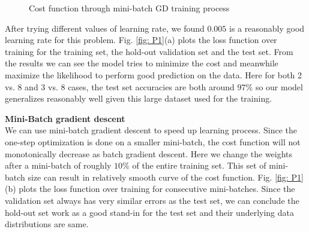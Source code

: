 \documentclass{article} %
\begin{document}
\begin{figure}%
	\centering
	\qquad
	\caption{Cost function through mini-batch GD training process}%
	\label{fig:P2}%
\end{figure}

After trying different values of learning rate, we found $0.005$ is a reasonably good learning rate for this problem. Fig. \ref{fig: P1}(a) plots the  loss function over training for the training set, the hold-out validation set and the test set. From the results we can see the model tries to minimize the cost and meanwhile maximize the likelihood to perform good prediction on the data. Here for both 2 vs. 8 and 3 vs. 8 cases, the test set accuracies are both around $97\%$ so our model generalizes reasonably well given this large dataset used for the training.

\textbf{Mini-Batch gradient descent}\\
We can use mini-batch gradient descent to speed up learning process. Since the one-step optimization is done on a smaller mini-batch, the cost function will not monotonically decrease as batch gradient descent. Here we change the weights after a mini-batch of roughly $10\%$ of the entire training set. This set of mini-batch size can result in relatively smooth curve of the cost function. Fig. \ref{fig: P1}(b) plots the loss function over training for consecutive mini-batches. Since the validation set always has very similar errors as the test set, we can conclude the hold-out set work as a good stand-in for the test set and their underlying data distributions are same.
\end{document}
